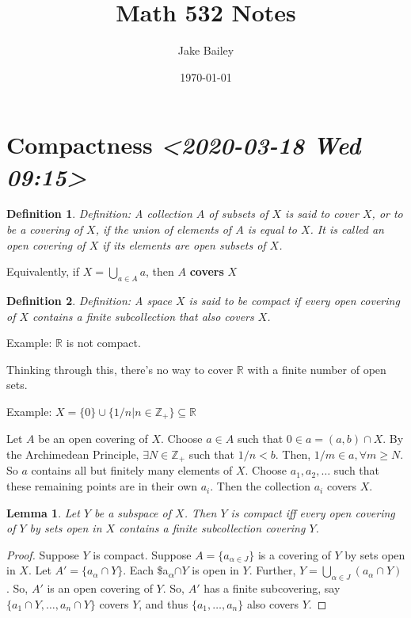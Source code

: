 \documentclass[11pt]{article}
\author{Jake Bailey}
\date{\today}
\title{Math 532 Notes}
\newtheorem{lemma}{Lemma}[section]
\newtheorem{definition}{Definition}[section]
\begin{document}
\maketitle
\tableofcontents

\section{Compactness \textit{<2020-03-18 Wed 09:15>}}
\label{sec:org9a459c2}
\begin{definition}
Definition: A collection \(A\) of subsets of \(X\) is said to \textit{cover} \(X\), or
to be a covering of \(X\), if the union of elements of \(A\) is equal to \(X\). It is
called an \textit{open covering} of \(X\) if its elements are open subsets of \(X\). 
\end{definition}

Equivalently, if \(X = \bigcup\limits_{a\in A} a\), then \(A\) \textbf{covers} \(X\)

\begin{definition}
Definition: A space \(X\) is said to be \textit{compact} if every open covering of
\(X\) contains a finite subcollection that also covers \(X\). 
\end{definition}

Example: \(\mathbb{R}\) is not compact.

Thinking through this, there's no way to cover \(\mathbb{R}\) with a finite number
of open sets.  

Example: \(X = \{0\}\cup\{1/n | n\in\mathbb{Z}_+\}\subseteq\mathbb{R}\)

Let \(A\) be an open covering of \(X\). Choose \(a \in A\) such that \(0 \in a = (a,b)
\cap X\). By the Archimedean Principle, \(\exists N\in \mathbb{Z}_+\) such that
\(1/n < b\). Then, \(1/m\in a, \forall m \geq N\). So \(a\) contains all but finitely
many elements of \(X\). Choose \(a_1, a_2, \ldots\) such that these remaining points
are in their own \(a_i\). Then the collection \(a_i\) covers \(X\).

\begin{lemma}
Let \(Y\) be a subspace of \(X\). Then \(Y\) is compact iff every open covering
of \(Y\) by sets open in \(X\) contains a finite subcollection covering \(Y\).  
\end{lemma}

\begin{proof}
Suppose \(Y\) is compact. Suppose \(A = \{a_{\alpha\in J}\}\) is a covering
of \(Y\) by sets open in \(X\). Let \(A' = \{a_{\alpha}\cap Y\}\). Each
\$a\textsubscript{\(\alpha\)}\(\cap Y\) is open in \(Y\). Further, \(Y = \bigcup\limits_{\alpha\in
J}(a_{\alpha}\cap Y)\). So, \(A'\) is an open covering of \(Y\). So, \(A'\) has a
finite subcovering, say \(\{a_1\cap Y,\ldots, a_n\cap Y\}\) covers \(Y\), and thus
\(\{a_1, \ldots, a_n\}\) also covers \(Y\). 
\end{proof}
\end{document}
